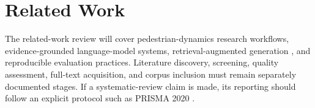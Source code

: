 \section{Related Work}

The related-work review will cover pedestrian-dynamics research workflows, evidence-grounded language-model systems, retrieval-augmented generation \cite{lewis2020retrieval}, and reproducible evaluation practices. Literature discovery, screening, quality assessment, full-text acquisition, and corpus inclusion must remain separately documented stages. If a systematic-review claim is made, its reporting should follow an explicit protocol such as PRISMA 2020 \cite{page2021prisma}.
